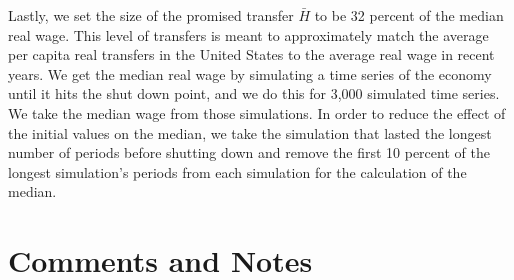 \documentclass[letterpaper,12pt]{article}
\theoremstyle{definition}
\begin{document}
  Lastly, we set the size of the promised transfer $\bar{H}$ to be 32 percent of the median real wage. This level of transfers is meant to approximately match the average per capita real transfers in the United States to the average real wage in recent years. We get the median real wage by simulating a time series of the economy until it hits the shut down point, and we do this for 3,000 simulated time series. We take the median wage from those simulations. In order to reduce the effect of the initial values on the median, we take the simulation that lasted the longest number of periods before shutting down and remove the first 10 percent of the longest simulation's periods from each simulation for the calculation of the median.


\newpage
\section{Comments and Notes}\label{TAppCommentsNotes}
\end{document}
